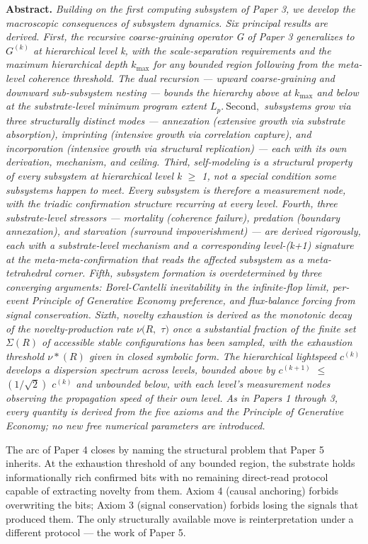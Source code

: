 \documentclass[11pt,oneside]{report}
\theoremstyle{definition}
\theoremstyle{remark}
\newenvironment{paperabstract}
  {\begin{center}\begin{minipage}{0.88\textwidth}\small
   \noindent\textbf{Abstract.}\itshape\space}
  {\end{minipage}\end{center}\vspace{0.4em}}
\begin{document}
\begin{paperabstract}
Building on the first computing subsystem of Paper 3, we develop the
macroscopic consequences of subsystem dynamics. Six principal results
are derived. First, the recursive coarse-graining operator G of Paper 3
generalizes to \ensuremath{G^{(k)}} at hierarchical level k, with the
scale-separation requirements and the maximum hierarchical depth \ensuremath{k_{\mathrm{max}}}
for any bounded region following from the meta-level coherence
threshold. The dual recursion --- upward coarse-graining and downward
sub-subsystem nesting --- bounds the hierarchy above at \ensuremath{k_{\mathrm{max}}} and below
at the substrate-level minimum program extent \ensuremath{L_{p}.~\text{Second},} subsystems
grow via three structurally distinct modes --- annexation (extensive
growth via substrate absorption), imprinting (intensive growth via
correlation capture), and incorporation (intensive growth via structural
replication) --- each with its own derivation, mechanism, and ceiling.
Third, self-modeling is a structural property of every subsystem at
hierarchical level k \ensuremath{\geq} 1, not a special condition some subsystems happen
to meet. Every subsystem is therefore a measurement node, with the
triadic confirmation structure recurring at every level. Fourth, three
substrate-level stressors --- mortality (coherence failure), predation
(boundary annexation), and starvation (surround impoverishment) --- are
derived rigorously, each with a substrate-level mechanism and a
corresponding level-(k+1) signature at the meta-meta-confirmation that
reads the affected subsystem as a meta-tetrahedral corner. Fifth,
subsystem formation is overdetermined by three converging arguments:
Borel-Cantelli inevitability in the infinite-flop limit, per-event
Principle of Generative Economy preference, and flux-balance forcing
from signal conservation. Sixth, novelty exhaustion is derived as the
monotonic decay of the novelty-production rate \ensuremath{\nu (R,} \ensuremath{\tau )} once a
substantial fraction of the finite set \ensuremath{\Sigma (R)} of accessible stable
configurations has been sampled, with the exhaustion threshold \ensuremath{\nu *(R)}
given in closed symbolic form. The hierarchical lightspeed \ensuremath{c^{(k)}}
develops a dispersion spectrum across levels, bounded above by
\ensuremath{c^{(k+1)}} \ensuremath{\leq} \ensuremath{(1/\sqrt{2})} \ensuremath{c^{(k)}} and unbounded below, with each level's
measurement nodes observing the propagation speed of their own level. As
in Papers 1 through 3, every quantity is derived from the five axioms
and the Principle of Generative Economy; no new free numerical
parameters are introduced.

The arc of Paper 4 closes by naming the structural problem that Paper 5
inherits. At the exhaustion threshold of any bounded region, the
substrate holds informationally rich confirmed bits with no remaining
direct-read protocol capable of extracting novelty from them. Axiom 4
(causal anchoring) forbids overwriting the bits; Axiom 3 (signal
conservation) forbids losing the signals that produced them. The only
structurally available move is reinterpretation under a different
protocol --- the work of Paper 5.
\end{paperabstract}
\end{document}
